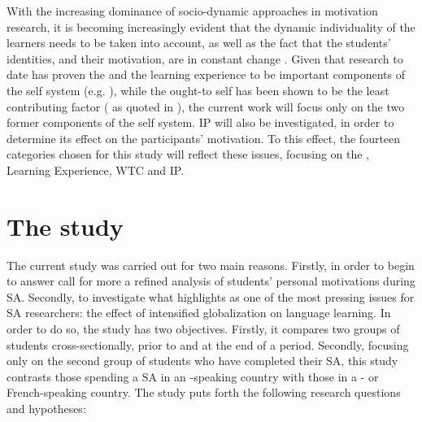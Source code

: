 \documentclass[output=paper]{langsci/langscibook}
\begin{document}
With the increasing dominance of socio-dynamic approaches in  motivation research, it is becoming increasingly evident that the dynamic individuality of the learners needs to be taken into account, as well as the fact that the students' identities, and their motivation, are in  constant change \citep{Guerrero2015}. Given that research to date has proven the  and the  learning experience to be important components of the   self system (e.g. \citealt{TaguchiEtAl2009,IslamEtAl2013,KimKim2014}), while the ought-to self has been shown to be the least contributing factor (\citealt{IslamEtAl2013,Papi2010} as quoted in  \citealt{TortCalvo2015}), the current work will focus only on the two former components of the   self system. {IP} will also be investigated, in order to determine its effect on the participants' motivation. To this effect, the fourteen categories chosen for this study will reflect these issues, focusing on the ,  Learning Experience, {WTC} and {IP}.


\section{The study}\label{sec:geoghegan:3}
\largerpage
The current study was carried out for two main reasons. Firstly, in order to begin to answer  call for more a refined analysis of students’ personal motivations during SA. Secondly, to investigate what \citet{Kinginger2009} highlights as one of the most pressing issues for SA researchers: the effect of intensified globalization on language learning. In order to do so, the study has two objectives. Firstly, it compares two groups of students cross-sectionally, prior to and at the end of a  period. Secondly, focusing only on the second group of students who have completed their SA, this study contrasts those spending a SA in an -speaking country with those in a - or French-speaking country. The study puts forth the following research questions and hypotheses:
\end{document}
